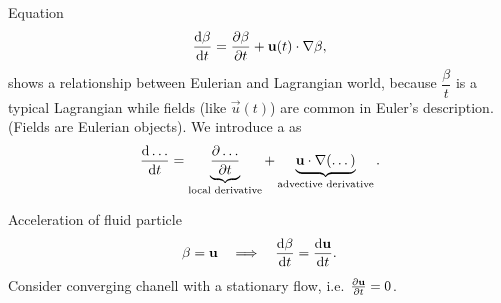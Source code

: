   \begin{figure}
    \centering
    \label{fig:1.8}
  \end{figure}


  Equation 
  \begin{equation}
    \frac{\mathrm{d} \beta}{\mathrm{d} t} = \frac{\partial \beta}{\partial t} + \mathbf{u}(t) \cdot \nabla \beta,
    \label{eq:1}
  \end{equation}
  shows a relationship between Eulerian and Lagrangian world, because
  $\dfrac{\beta}{t}$ is a typical Lagrangian while fields (like $\vec u(t)$) are common in Euler's description.
  (Fields are Eulerian objects).
  We introduce a  as 
  \begin{displaymath}
    \frac{\mathrm{d} \dots}{\mathrm{d} t} = \underbrace{\frac{\partial \dots}{\partial t}}_{\textrm{local derivative}} + \underbrace{\mathbf{u} \cdot \nabla(\dots)}_{\textrm{advective derivative}}.
  \end{displaymath}
  
  Acceleration of fluid particle
  \begin{displaymath}
    \beta = \mathbf{u} \quad \Longrightarrow \quad \frac{\mathrm{d} \beta}{\mathrm{d} t} = \frac{\mathrm{d} \mathbf{u}}{\mathrm{d} t}.
  \end{displaymath}
  Consider converging chanell with a stationary flow, i.e. $\frac{\partial \mathbf{u}}{\partial t} = 0$.


  \begin{figure}
    \centering
    \label{fig:1.9}
  \end{figure}

